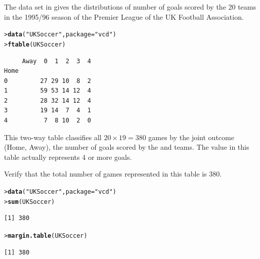 \documentclass[11pt]{report}\usepackage[]{graphicx}\usepackage[]{color}
\makeatletter
\newcommand{\hlstr}[1]{\textcolor[rgb]{0.192,0.494,0.8}{#1}}%
\newcommand{\hlstd}[1]{\textcolor[rgb]{0.345,0.345,0.345}{#1}}%
\newcommand{\hlkwc}[1]{\textcolor[rgb]{0.333,0.667,0.333}{#1}}%
\newcommand{\hlkwd}[1]{\textcolor[rgb]{0.737,0.353,0.396}{\textbf{#1}}}%
\newenvironment{kframe}{%
 \def\at@end@of@kframe{}%
 \ifinner\ifhmode%
  \def\at@end@of@kframe{\end{minipage}}%
  \begin{minipage}{\columnwidth}%
 \fi\fi%
 \def\FrameCommand##1{\hskip\@totalleftmargin \hskip-\fboxsep
 \colorbox{shadecolor}{##1}\hskip-\fboxsep
     \hskip-\linewidth \hskip-\@totalleftmargin \hskip\columnwidth}%
 \MakeFramed {\advance\hsize-\width
   \@totalleftmargin\z@ \linewidth\hsize
   \@setminipage}}%
 {\par\unskip\endMakeFramed%
 \at@end@of@kframe}
\newenvironment{knitrout}{}{} %
\renewenvironment{knitrout}{\small\renewcommand{\baselinestretch}{.85}}{} %
\makeatother
\begin{document}
\begin{Exercises}
\begin{enumerate*}
  \end{enumerate*}

\exercise The data set  in  gives the distributions of
number of goals scored by the 20 teams in the  1995/96 season of the
Premier League of the UK Football Association.
\begin{knitrout}
\color{fgcolor}\begin{kframe}
\begin{alltt}
\hlstd{> }\hlkwd{data}\hlstd{(}\hlstr{"UKSoccer"}\hlstd{,} \hlkwc{package} \hlstd{=} \hlstr{"vcd"}\hlstd{)}
\hlstd{> }\hlkwd{ftable}\hlstd{(UKSoccer)}
\end{alltt}
\begin{verbatim}
     Away  0  1  2  3  4
Home                    
0         27 29 10  8  2
1         59 53 14 12  4
2         28 32 14 12  4
3         19 14  7  4  1
4          7  8 10  2  0
\end{verbatim}
\end{kframe}
\end{knitrout}
This two-way table classifies all $20 \times 19 = 380$ games by the joint
outcome (Home, Away), the number of goals scored by the  and
 teams.
The value  in this table actually represents 4 or more goals.

  \begin{enumerate*}
    \item Verify that the total number of games represented in this table is 380.
    \begin{ans}
\begin{knitrout}
\color{fgcolor}\begin{kframe}
\begin{alltt}
\hlstd{> }\hlkwd{data}\hlstd{(}\hlstr{"UKSoccer"}\hlstd{,} \hlkwc{package}\hlstd{=}\hlstr{"vcd"}\hlstd{)}
\hlstd{> }\hlkwd{sum}\hlstd{(UKSoccer)}
\end{alltt}
\begin{verbatim}
[1] 380
\end{verbatim}
\begin{alltt}
\hlstd{> }\hlkwd{margin.table}\hlstd{(UKSoccer)}
\end{alltt}
\begin{verbatim}
[1] 380
\end{verbatim}
\end{kframe}
\end{knitrout}
    \end{ans}
    

\end{enumerate*}
\end{Exercises}
\end{document}
